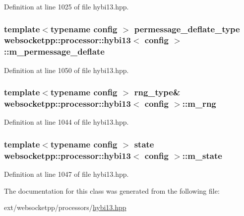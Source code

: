 Definition at line 1025 of file hybi13.\+hpp.

\hypertarget{classwebsocketpp_1_1processor_1_1hybi13_a9103ac43ba28b3b3e5cedf519b1c67c5}{}
\subsubsection[{m\+\_\+permessage\+\_\+deflate}]{\setlength{\rightskip}{0pt plus 5cm}template$<$typename config $>$ {\bf permessage\+\_\+deflate\+\_\+type} {\bf websocketpp\+::processor\+::hybi13}$<$ config $>$\+::m\+\_\+permessage\+\_\+deflate\hspace{0.3cm}{\ttfamily [protected]}}\label{classwebsocketpp_1_1processor_1_1hybi13_a9103ac43ba28b3b3e5cedf519b1c67c5}


Definition at line 1050 of file hybi13.\+hpp.

\hypertarget{classwebsocketpp_1_1processor_1_1hybi13_a3e6ee5afc8a635c0a410f678bda8ea84}{}
\subsubsection[{m\+\_\+rng}]{\setlength{\rightskip}{0pt plus 5cm}template$<$typename config $>$ {\bf rng\+\_\+type}\& {\bf websocketpp\+::processor\+::hybi13}$<$ config $>$\+::m\+\_\+rng\hspace{0.3cm}{\ttfamily [protected]}}\label{classwebsocketpp_1_1processor_1_1hybi13_a3e6ee5afc8a635c0a410f678bda8ea84}


Definition at line 1044 of file hybi13.\+hpp.

\hypertarget{classwebsocketpp_1_1processor_1_1hybi13_a4660c14a2a241a2439fb3aa497ab5886}{}
\subsubsection[{m\+\_\+state}]{\setlength{\rightskip}{0pt plus 5cm}template$<$typename config $>$ {\bf state} {\bf websocketpp\+::processor\+::hybi13}$<$ config $>$\+::m\+\_\+state\hspace{0.3cm}{\ttfamily [protected]}}\label{classwebsocketpp_1_1processor_1_1hybi13_a4660c14a2a241a2439fb3aa497ab5886}


Definition at line 1047 of file hybi13.\+hpp.



The documentation for this class was generated from the following file\+:\begin{DoxyCompactItemize}
\item 
ext/websocketpp/processors/\hyperlink{hybi13_8hpp}{hybi13.\+hpp}\end{DoxyCompactItemize}
